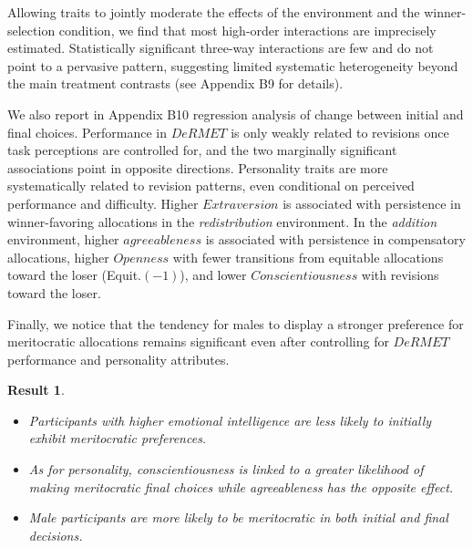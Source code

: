 \documentclass[11pt]{article}
\newtheorem{Result}{Result}
\begin{document}
Allowing traits to jointly moderate the effects of the environment and the winner-selection condition, we find that most high-order interactions are imprecisely estimated. Statistically significant three-way interactions are few and do not point to a pervasive pattern, suggesting limited systematic heterogeneity beyond the main treatment contrasts (see Appendix B9 for details). 

We also report in Appendix B10 regression analysis of change between initial and final choices. Performance in $DeRMET$ is only weakly related to revisions once task perceptions are controlled for, and the two marginally significant associations point in opposite directions. Personality traits are more systematically related to revision patterns, even conditional on perceived performance and difficulty. Higher $Extraversion$ is associated with persistence in winner-favoring allocations in the \emph{redistribution} environment. In the \emph{addition} environment, higher $agreeableness$ is associated with persistence in compensatory allocations, higher $Openness$ with fewer transitions from equitable allocations toward the loser (Equit.$(-1)$), and lower $Conscientiousness$ with revisions toward the loser.

Finally, we notice that the tendency for males to display a stronger preference for meritocratic allocations remains significant even after controlling for $DeRMET$ performance and personality attributes. 

\begin{Result} \label{res-noncog} 

\noindent \begin{itemize}[noitemsep, topsep=0pt, parsep=0pt, partopsep=0pt]



\item[\textbf{a)}] Participants with higher emotional intelligence are less likely to initially exhibit meritocratic preferences. 
\item[\textbf{b)}] As for personality, conscientiousness is linked to a greater likelihood of making meritocratic final choices while agreeableness has the opposite effect.
\item[\textbf{c)}]  Male participants are more likely to be meritocratic in both initial and final decisions.
\end{itemize}

\end{Result}


\end{document}
